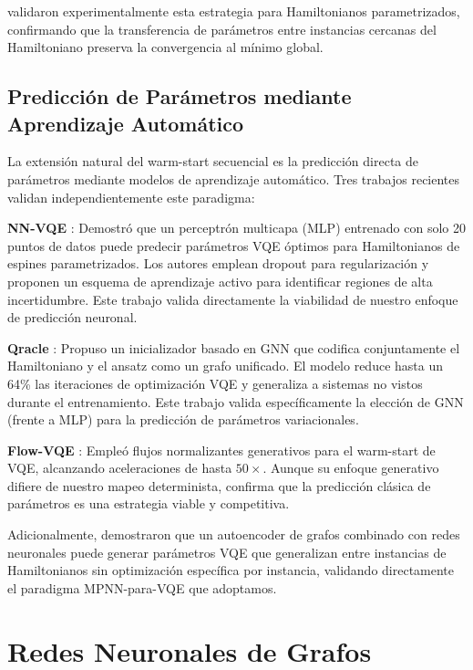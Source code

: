 \documentclass[11pt,a4paper,spanish]{book}
\begin{document}
\citet{skogh2023} validaron experimentalmente esta estrategia para Hamiltonianos parametrizados, confirmando que la transferencia de parámetros entre instancias cercanas del Hamiltoniano preserva la convergencia al mínimo global.

\subsection{Predicción de Parámetros mediante Aprendizaje Automático}

La extensión natural del warm-start secuencial es la predicción directa de parámetros mediante modelos de aprendizaje automático. Tres trabajos recientes validan independientemente este paradigma:

\textbf{NN-VQE} \citep{miao2024}: Demostró que un perceptrón multicapa (MLP) entrenado con solo 20 puntos de datos puede predecir parámetros VQE óptimos para Hamiltonianos de espines parametrizados. Los autores emplean dropout para regularización y proponen un esquema de aprendizaje activo para identificar regiones de alta incertidumbre. Este trabajo valida directamente la viabilidad de nuestro enfoque de predicción neuronal.

\textbf{Qracle} \citep{zhang2025}: Propuso un inicializador basado en GNN que codifica conjuntamente el Hamiltoniano y el ansatz como un grafo unificado. El modelo reduce hasta un 64\% las iteraciones de optimización VQE y generaliza a sistemas no vistos durante el entrenamiento. Este trabajo valida específicamente la elección de GNN (frente a MLP) para la predicción de parámetros variacionales.

\textbf{Flow-VQE} \citep{zou2026}: Empleó flujos normalizantes generativos para el warm-start de VQE, alcanzando aceleraciones de hasta $50\times$. Aunque su enfoque generativo difiere de nuestro mapeo determinista, confirma que la predicción clásica de parámetros es una estrategia viable y competitiva.

Adicionalmente, \citet{lee2026} demostraron que un autoencoder de grafos combinado con redes neuronales puede generar parámetros VQE que generalizan entre instancias de Hamiltonianos sin optimización específica por instancia, validando directamente el paradigma MPNN-para-VQE que adoptamos.

\section{Redes Neuronales de Grafos}
\end{document}
